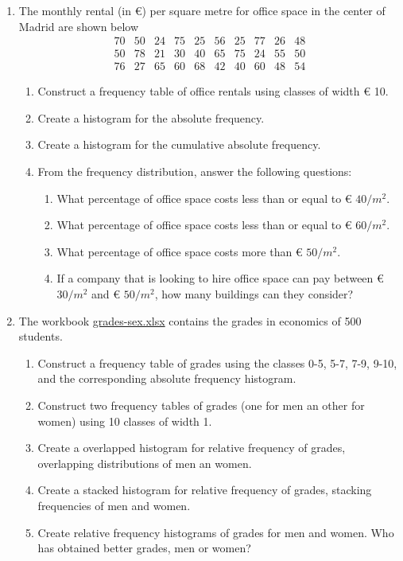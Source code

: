 \begin{enumerate}[leftmargin=*,resume]
\item The monthly rental (in €) per square metre for office space in the center of Madrid are shown below
\[
\begin{array}{cccccccccc}
70 & 50 & 24 & 75 & 25 & 56 & 25 & 77 & 26 & 48 \\
50 & 78 & 21 & 30 & 40 & 65 & 75 & 24 & 55 & 50 \\
76 & 27 & 65 & 60 & 68 & 42 & 40 & 60 & 48 & 54
\end{array}
\]

\begin{enumerate}
\item Construct a frequency table of office rentals using classes of width € 10. 
\item Create a histogram for the absolute frequency.
\item Create a histogram for the cumulative absolute frequency. 
\item From the frequency distribution, answer the following questions:
\begin{enumerate}
\item What percentage of office space costs less than or equal to € $40/m^2$.
\item What percentage of office space costs less than or equal to € $60/m^2$.
\item What percentage of office space costs more than € $50/m^2$.
\item If a company that is looking to hire office space can pay between € $30/m^2$ and € $50/m^2$, how many buildings
can they consider?
\end{enumerate}
\end{enumerate}


\item The workbook
\href{http://aprendeconalf.es/office/excel/exercises/descriptive-statistics/grades-sex.xlsx}{\textsf{grades-sex.xlsx}}
contains the grades in economics of 500 students. 
\begin{enumerate}
\item Construct a frequency table of grades using the classes 0-5, 5-7, 7-9, 9-10, and the corresponding absolute
frequency histogram. 
\item Construct two frequency tables of grades (one for men an other for women) using 10 classes of width 1. 
\item Create a overlapped histogram for relative frequency of grades, overlapping distributions of men an women.  
\item Create a stacked histogram for relative frequency of grades, stacking frequencies of men and women. 
\item Create relative frequency histograms of grades for men and women. 
Who has obtained better grades, men or women?  
\end{enumerate}



\end{enumerate}
